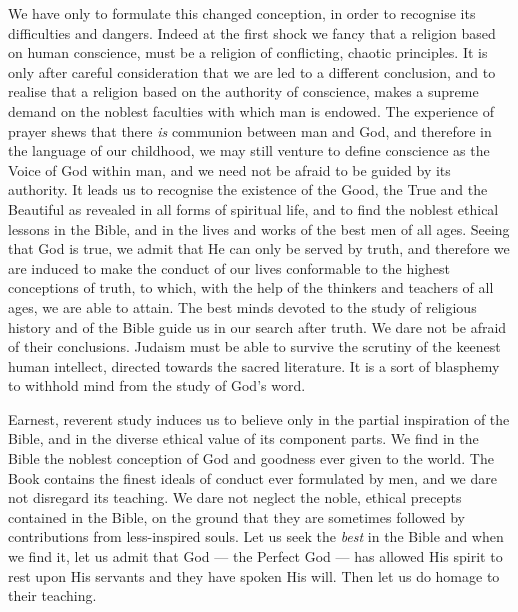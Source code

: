 We have only to formulate this changed
conception, in order to recognise its difficulties
and dangers. Indeed at the first shock
we fancy that a religion based on human
conscience, must be a religion of conflicting,
chaotic principles. It is only after careful
consideration that we are led to a different
conclusion, and to realise that a religion
based on the authority of conscience, makes
a supreme demand on the noblest faculties
with which man is endowed. The experience
of prayer shews that there \textsl{is} communion
between man and God, and therefore
in the language of our childhood, we
may still venture to define conscience as the
Voice of God within man, and we need not
be afraid to be guided by its authority. It
leads us to recognise the existence of the
Good, the True and the Beautiful as revealed
in all forms of spiritual life, and to
find the noblest ethical lessons in the Bible,
and in the lives and works of the best men
of all ages. Seeing that God is true, we
admit that He can only be served by truth,
and therefore we are induced to make the
conduct of our lives conformable to the
highest conceptions of truth, to which, with
the help of the thinkers and teachers of all
ages, we are able to attain. The best minds
devoted to the study of religious history and
of the Bible guide us in our search after
truth. We dare not be afraid of their conclusions.
Judaism must be able to survive
the scrutiny of the keenest human intellect,
directed towards the sacred literature. It
is a sort of blasphemy to withhold mind from
the study of God’s word.

Earnest, reverent study induces us to
believe only in the partial inspiration of the
Bible, and in the diverse ethical value of its
component parts. We find in the Bible the
noblest conception of God and goodness ever
given to the world. The Book contains the
finest ideals of conduct ever formulated by
men, and we dare not disregard its teaching.
We dare not neglect the noble, ethical
precepts contained in the Bible, on the
ground that they are sometimes followed by
contributions from less-inspired souls. Let
us seek the \textsl{best} in the Bible and when we
find it, let us admit that God — the Perfect
God — has allowed His spirit to rest upon
His servants and they have spoken His
will. Then let us do homage to their
teaching.


